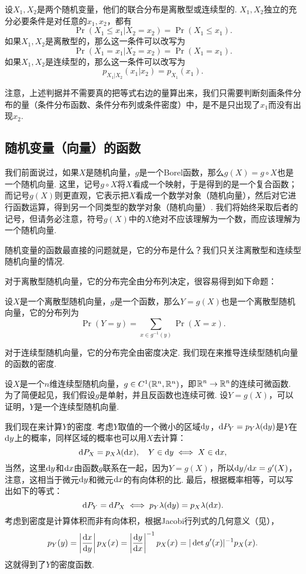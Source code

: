 \begin{proposition}\label{prop:independence-conditional}
设$X_1,X_2$是两个随机变量，他们的联合分布是离散型或连续型的. $X_1,X_2$独立的充分必要条件是对任意的$x_1,x_2$，都有
\[\Pr(X_1\leq x_1|X_2=x_2)=\Pr(X_1\leq x_1).\]
如果$X_1,X_2$是离散型的，那么这一条件可以改写为
\[\Pr(X_1=x_1|X_2=x_2)=\Pr(X_1=x_1).\]
如果$X_1,X_2$是连续型的，那么这一条件可以改写为
\[p_{X_1|X_2}(x_1|x_2)=p_{X_1}(x_1).\]
\end{proposition}

注意，上述判据并不需要真的把等式右边的量算出来，我们只需要判断刻画条件分布的量（条件分布函数、条件分布列或条件密度）中，是不是只出现了$x_1$而没有出现$x_2$. 

\subsection{随机变量（向量）的函数}\label{subsec:random-function}

我们前面说过，如果$X$是随机向量，$g$是一个Borel函数，那么$g(X)=g\circ X$也是一个随机向量. 这里，记号$g\circ X$将$X$看成一个映射，于是得到的是一个复合函数；而记号$g(X)$则更直观，它表示把$X$看成一个数学对象（随机向量），然后对它进行函数运算，得到另一个同类型的数学对象（随机向量）. 我们将始终采取后者的记号，但请务必注意，符号$g(X)$中的$X$绝对不应该理解为一个数，而应该理解为一个随机向量. 

随机变量的函数最直接的问题就是，它的分布是什么？我们只关注离散型和连续型随机向量的情况.

对于离散型随机向量，它的分布完全由分布列决定，很容易得到如下命题：

\begin{theorem}\label{thm:discrete-function}
设$X$是一个离散型随机向量，$g$是一个函数，那么$Y=g(X)$也是一个离散型随机向量，它的分布列为
\[\Pr(Y=y)=\sum_{x\in g^{-1}(y)}\Pr(X=x).\]
\end{theorem}

对于连续型随机向量，它的分布完全由密度决定. 我们现在来推导连续型随机向量的函数的密度. 

设$X$是一个$n$维连续型随机向量，$g\in C^1(\mathbb{R}^n,\mathbb{R}^n)$，即$\mathbb{R}^n\to\mathbb{R}^n$的连续可微函数. 为了简便起见，我们假设$g$是单射，并且反函数也连续可微. 设$Y=g(X)$，可以证明，$Y$是一个连续型随机向量. 

我们现在来计算$Y$的密度. 考虑$Y$取值的一个微小的区域$\mathrm{d} y$，$\mathrm{d} P_Y=p_Y\lambda(\mathrm{d} y)$是$Y$在$\mathrm{d} y$上的概率，同样区域的概率也可以用$X$去计算：
\[\mathrm{d} P_X=p_X\lambda(\mathrm{d} x),\quad Y\in\mathrm{d} y\iff X\in\mathrm{d} x,\]
当然，这里$\mathrm{d} y$和$\mathrm{d} x$由函数$g$联系在一起，因为$Y=g(X)$，所以$\mathrm{d} y/\mathrm{d} x=g'(X)$，注意，这相当于微元$\mathrm{d} y$和微元$\mathrm{d} x$的有向体积的比. 最后，根据概率相等，可以写出如下的等式：
\begin{equation}
    \mathrm{d} P_Y=\mathrm{d} P_X\iff p_Y\lambda(\mathrm{d} y)=p_X\lambda(\mathrm{d} x).\label{eq:eq-prob}
\end{equation}
考虑到密度是计算体积而非有向体积，根据Jacobi行列式的几何意义（见），
\[p_Y(y)=\left|\frac{\mathrm{d} x}{\mathrm{d} y}\right|p_X(x)=\left|\frac{\mathrm{d} y}{\mathrm{d} x}\right|^{-1}p_X(x)=|\det g'(x)|^{-1}p_X(x).\]
这就得到了$Y$的密度函数. 

